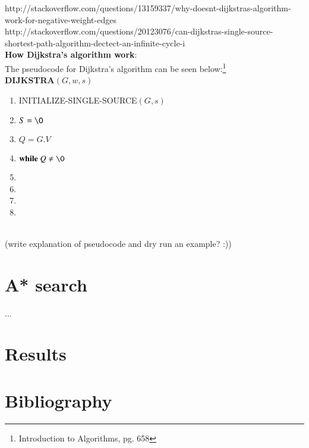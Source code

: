 \documentclass[11pt]{article}
\begin{document}
http://stackoverflow.com/questions/13159337/why-doesnt-dijkstras-algorithm-work-for-negative-weight-edges\\

http://stackoverflow.com/questions/20123076/can-dijkstras-single-source-shortest-path-algorithm-dectect-an-infinite-cycle-i\\

\noindent
\textbf{How Dijkstra's algorithm work}:\\
The pseudocode for Dijkstra's algorithm can be seen below:\footnote{Introduction to Algorithms, pg. 658}\\


\textbf{DIJKSTRA$(G, w, s)$}
\begin{enumerate}
\setlength\itemsep{0em}
\item INITIALIZE-SINGLE-SOURCE$(G, s)$
\item $S = \O$
\item $Q = G.V$
\item $\textbf{while } Q \neq \O$
\item {}
\item {}
\item {}
\item \tab{}
\end{enumerate}

\noindent
\\
(write explanation of pseudocode and dry run an example? :))


\section{A* search}
...\\



\section{Results}
\section{Bibliography}
\end{document}
